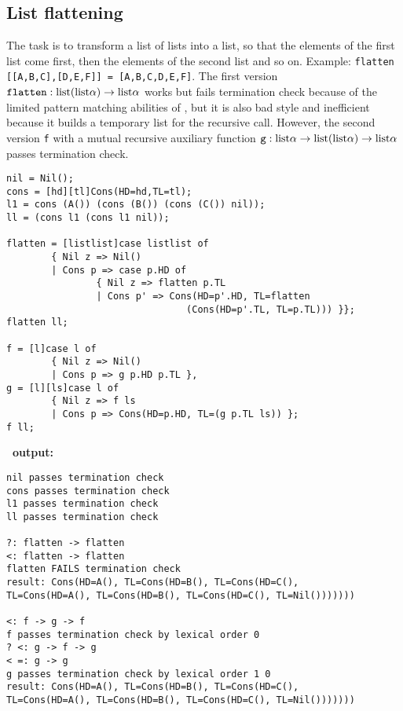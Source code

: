 \subsection{List flattening\label{ex:flatten}}
The task is to transform a list of lists into a list, so that the
elements of the first list come first, then the elements of the second
list and so on. Example: {\tt flatten [[A,B,C],[D,E,F]] = [A,B,C,D,E,F]}.
The first version $\mathtt{flatten} : \mathrm{list}(\mathrm{list} \alpha)
\rightarrow \mathrm{list} \alpha$ works but fails termination check
because of the limited pattern matching abilities of \foetus, but it is
also bad style and inefficient because it builds a temporary list for
the recursive call. However, the second version {\tt f} with a mutual
recursive auxiliary function $\mathtt{g} : \mathrm{list} \alpha \rightarrow
\mathrm{list}(\mathrm{list} \alpha) \rightarrow \mathrm{list} \alpha$ passes termination check.
\begin{verbatim}
nil = Nil();
cons = [hd][tl]Cons(HD=hd,TL=tl);
l1 = cons (A()) (cons (B()) (cons (C()) nil));
ll = (cons l1 (cons l1 nil));

flatten = [listlist]case listlist of
        { Nil z => Nil()
        | Cons p => case p.HD of
                { Nil z => flatten p.TL
                | Cons p' => Cons(HD=p'.HD, TL=flatten
                                (Cons(HD=p'.TL, TL=p.TL))) }};
flatten ll;

f = [l]case l of
        { Nil z => Nil()
        | Cons p => g p.HD p.TL },
g = [l][ls]case l of
        { Nil z => f ls
        | Cons p => Cons(HD=p.HD, TL=(g p.TL ls)) };
f ll;
\end{verbatim}
{\bf \foetus\ output:}\nopagebreak
\begin{verbatim}
nil passes termination check
cons passes termination check
l1 passes termination check
ll passes termination check

?: flatten -> flatten
<: flatten -> flatten
flatten FAILS termination check
result: Cons(HD=A(), TL=Cons(HD=B(), TL=Cons(HD=C(),
TL=Cons(HD=A(), TL=Cons(HD=B(), TL=Cons(HD=C(), TL=Nil()))))))

<: f -> g -> f
f passes termination check by lexical order 0
? <: g -> f -> g
< =: g -> g
g passes termination check by lexical order 1 0
result: Cons(HD=A(), TL=Cons(HD=B(), TL=Cons(HD=C(),
TL=Cons(HD=A(), TL=Cons(HD=B(), TL=Cons(HD=C(), TL=Nil()))))))
\end{verbatim}
